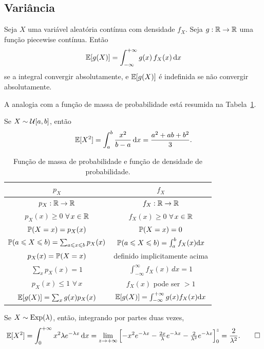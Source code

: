 \subsection{Variância}

\begin{proposition}
Seja $ X $ uma variável aleatória contínua com densidade $ f_X $.
Seja $ g:\mathbb{R} \to \mathbb{R} $ uma função piecewise contínua.
Então
\[
\mathbb{E}[g(X)] = \int_{-\infty}^{+\infty} g(x) \, f_X(x) \, \mathrm{d} x
\]
se a integral convergir absolutamente, e $ \mathbb{E}[g(X)] $ é indefinida se não convergir absolutamente.
\end{proposition}

A analogia com a função de massa de probabilidade está resumida na Tabela~\ref{table:comparison}.

\begin{example}
[Uniforme]
Se $X\sim \mathcal{U} [a,b]$, então
\[
\mathbb{E} [X^2] = \int_a^b \frac{x^2}{b-a} \, \mathrm{d} x = \frac{a^2+ab+b^2}{3}.
\]
\end{example}

\begin{table}[b!]
\centering
\def\arraystretch{1.7}%
\begin{tabular}{|c|c|}
\hline
$p_X$ 			&	$f_X$	\\
\hline
$p_X:\mathbb{R}\to\mathbb{R}$ 		&	$f_X:\mathbb{R}\to\mathbb{R}$	\\
$p_X(x) \geq 0$ $\forall \, x \in \mathbb{R}$
			& $f_X(x) \geq 0$ $\forall \, x \in \mathbb{R}$ \\
$\mathbb{P}(X=x)=p_X(x)$ 	& 	$\mathbb{P}(X=x)=0$ \\
$ \mathbb{P}(a \leqslant X \leqslant b) = \sum_{a \leqslant x \leqslant b} p_X(x) $
			& 	$ \mathbb{P}(a \leqslant X \leqslant b) = \int_a^b f_X(x) \mathrm{d} x $ \\
$p_X(x)=\mathbb{P}(X=x)$ 	& 	definido implicitamente acima \\
$\sum_{x}p_X(x) =1$ & $\int_{-\infty}^{\infty} f_X(x) \, dx=1$ \\
$ p_X(x) \leq 1$ $\forall \, x$ & $f_X(x)$ pode ser $>1$ \\
$ \mathbb{E}[g(X)] = \sum_x g(x) p_X(x) $ & $ \mathbb{E}[g(X)] = \int_{-\infty}^{+\infty} g(x) f_X(x) \mathrm{d} x $ \\
\hline
\end{tabular}
\caption{Função de massa de probabilidade e função de densidade de probabilidade.}
\label{table:comparison}
\end{table}

\begin{example}
[Exponencial]
Se $X\sim\mathrm{Exp}(\lambda)$,
então, integrando por partes duas vezes,
\[
\mathbb{E} [X^2]
=
\int_0^{+\infty} x^2 \lambda e^{-\lambda x} \, \mathrm{d} x
=
\lim_{z\to{+\infty}}
\Big[
{-x^2}
e^{-\lambda x}
-
\tfrac{2x}{\lambda}
e^{-\lambda x}
-
\tfrac{2}{\lambda^2}
e^{-\lambda x}
\Big]_0^z
=
\frac{2}{\lambda^2}
.
\qedhere
\]
\end{example}

